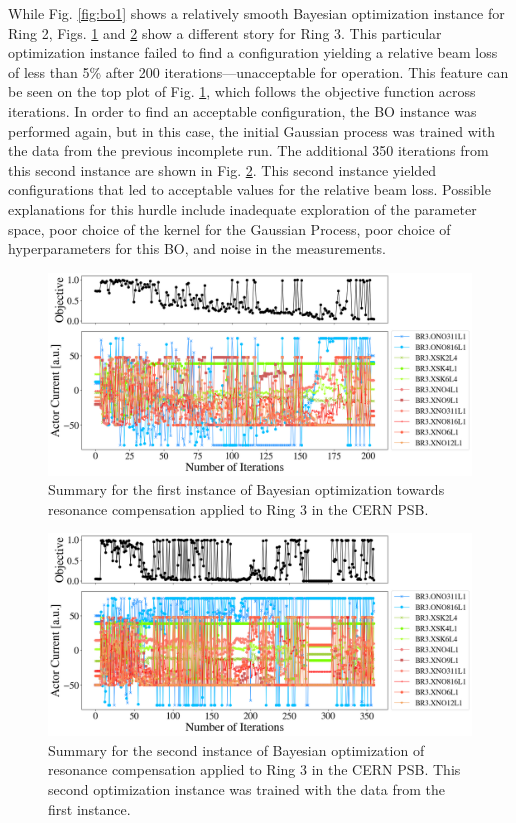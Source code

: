 While Fig. \ref{fig:bo1} shows a relatively smooth Bayesian optimization instance for Ring 2, Figs. \ref{fig:bo21} and \ref{fig:bo22} show a different story for Ring 3. This particular optimization instance failed to find a configuration yielding a relative beam loss of less than 5\% after 200 iterations---unacceptable for operation. This feature can be seen on the top plot of Fig. \ref{fig:bo21}, which follows the objective function across iterations. In order to find an acceptable configuration, the BO instance was performed again, but in this case, the initial Gaussian process was trained with the data from the previous incomplete run. The additional 350 iterations from this second instance are shown in Fig. \ref{fig:bo22}. This second instance yielded configurations that led to acceptable values for the relative beam loss. Possible explanations for this hurdle include inadequate exploration of the parameter space, poor choice of the kernel for the Gaussian Process, poor choice of hyperparameters for this BO, and noise in the measurements.

\begin{figure}[H]
    \centering
    \includegraphics[width=\linewidth]{chapter5/2023_05_02_R3_LHCramp_BayesOpt.png}
    \caption{Summary for the first instance of Bayesian optimization towards resonance compensation applied to Ring 3 in the CERN PSB.}
    \label{fig:bo21}
   \vspace{-1.25em}
\end{figure}

\begin{figure}[H]
    \centering
    \includegraphics[width=\linewidth]{chapter5/2023_05_02_R3_LHCramp_BayesOpt_itrtn2.png}
    \caption{Summary for the second instance of Bayesian optimization of resonance compensation applied to Ring 3 in the CERN PSB. This second optimization instance was trained with the data from the first instance.}
    \label{fig:bo22}
   \vspace{-1.25em}
\end{figure}

